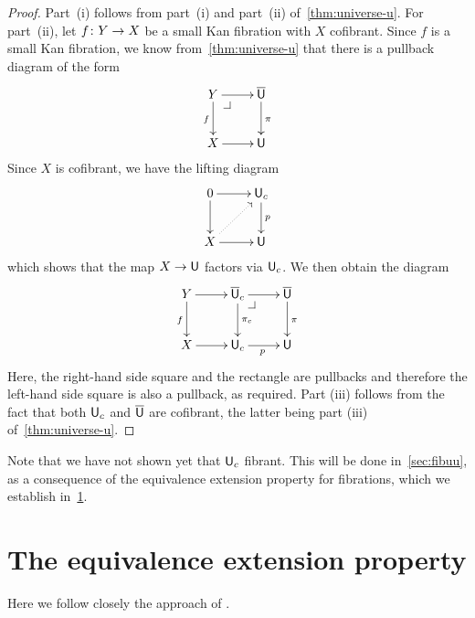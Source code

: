 \documentclass[reqno,10pt,a4paper,oneside,draft]{amsart}
\begin{document}
\begin{proof} Part~(i) follows from part~(i) and part~(ii) of~\cref{thm:universe-u}. For part~(ii), 
let $f \colon Y \to X$ be a small Kan fibration with $X$ cofibrant. Since $f$ is a
small Kan fibration, we know 
from~\cref{thm:universe-u} that there is a pullback diagram of the form 
\[
\xymatrix{
Y \ar[r] \ar[d]_f \drpullback & \UU \ar[d]^{\pi} \\
X \ar[r] & \U }
\]
Since $X$ is cofibrant, we have the lifting diagram
\[
\xymatrix{
0 \ar[r] \ar[d] & \U_c \ar[d]^{p} \\
X \ar[r] \ar@{.>}[ur] & \U }
\]
which shows that the map $X \to \mathsf{U}$ factors via $\mathsf{U}_c$.  We then obtain the diagram
\[
\xymatrix{
Y \ar[r] \ar[d]_f &  \UU_c \ar[r]  \ar[d]^{\pi_c} \drpullback & \UU \ar[d]^{\pi} \\
X \ar[r] & \U_c \ar[r]_p &  \U }
\]
Here, the right-hand side square and the rectangle are pullbacks and therefore the left-hand
side square is also a pullback, as required. Part (iii) follows from the fact that both $\mathsf{U}_c$ and
$\overline{\mathsf{U}}$ are cofibrant, the latter being part (iii) of~\cref{thm:universe-u}.
\end{proof} 





Note that we have not shown yet that $\mathsf{U}_c$ fibrant. This will be done in~\cref{sec:fibuu}, as a consequence of the equivalence extension property for fibrations, which we establish in~\cref{sec:equep}.

\newpage


\section{The equivalence extension property}
\label{sec:equep}


Here we follow closely the approach of \cite{voevodsky-simplicial-model}.
\end{document}
